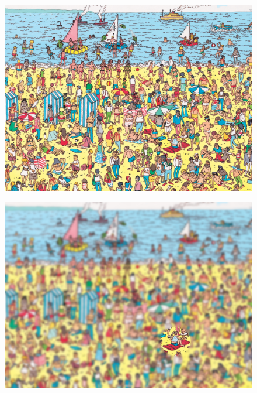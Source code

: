 \documentclass[10pt]{beamer}
\begin{document}
\begin{frame}{}
    \begin{figure}
        \centering
        \includegraphics[width=0.9\linewidth]{./img/wheres_wally.jpg}
    \end{figure}
\end{frame}

\begin{frame}{}
    \begin{figure}
        \centering
        \includegraphics[width=0.9\linewidth]{./img/wheres_wally_focus_1.jpg}
    \end{figure}
\end{frame}
\end{document}
